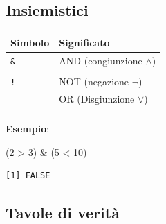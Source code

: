 \documentclass[
  ignorenonframetext,
  compress, aspectratio=149]{beamer}
\newenvironment{Shaded}{}{}
\newcommand{\DecValTok}[1]{\textcolor[rgb]{0.69,0.50,0.00}{#1}}
\newcommand{\NormalTok}[1]{\textcolor[rgb]{0.12,0.11,0.11}{#1}}
\newcommand{\SpecialCharTok}[1]{\textcolor[rgb]{0.24,0.68,0.91}{#1}}
\begin{document}
\subsection{Insiemistici}\label{insiemistici}

\begin{frame}[fragile]{}
\label{section-6}
\begin{longtable}[]{@{}ll@{}}
\toprule\noalign{}
Simbolo & Significato \\
\midrule\noalign{}
\endhead
\texttt{\&} & AND (congiunzione \(\land\)) \\
& \\
\texttt{!} & NOT (negazione \(\lnot\)) \\
\texttt{\textbar{}} & OR (Disgiunzione \(\lor\)) \\
\bottomrule\noalign{}
\end{longtable}

\textbf{Esempio}:

\begin{Shaded}
\begin{Highlighting}[]
\NormalTok{(}\DecValTok{2} \SpecialCharTok{\textgreater{}} \DecValTok{3}\NormalTok{) }\SpecialCharTok{\&}\NormalTok{ (}\DecValTok{5} \SpecialCharTok{\textless{}} \DecValTok{10}\NormalTok{)}
\end{Highlighting}
\end{Shaded}

\pause

\begin{verbatim}
[1] FALSE
\end{verbatim}
\end{frame}

\subsection{Tavole di verità}\label{tavole-di-verituxe0}
\end{document}
